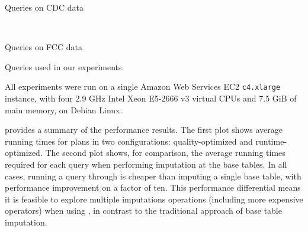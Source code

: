 \begin{table}
\centering
 \begin{subtable}{\linewidth}
  
  \caption{Queries on CDC data}
  \label{fig:queries-cdc}
 \end{subtable}
 ~
 \begin{subtable}{\linewidth}
 
 \caption{Queries on FCC data}
 \label{fig:queries-fcc}
 \end{subtable}
  \caption{Queries used in our experiments.}
  \label{fig:queries}
\end{table}

%  

All experiments were run on a single Amazon Web Services EC2 {\tt c4.xlarge} instance, with
four 2.9 GHz Intel Xeon E5-2666 v3 virtual CPUs and 7.5 GiB of main memory, on Debian Linux.

 provides a summary of the performance results. The first plot
shows average running times for \ProjectName{} plans in two configurations:
quality-optimized and runtime-optimized. The second plot shows, for comparison, the average
running times required for each query when performing imputation at the base tables.  In all
cases, running a query through \ProjectName{} is cheaper than imputing a single base table,
with performance improvement on a factor of ten. This performance differential means it is feasible
to explore multiple imputations operations (including more expensive operators) when using
\ProjectName{}, in contrast to the traditional approach of base table imputation.

